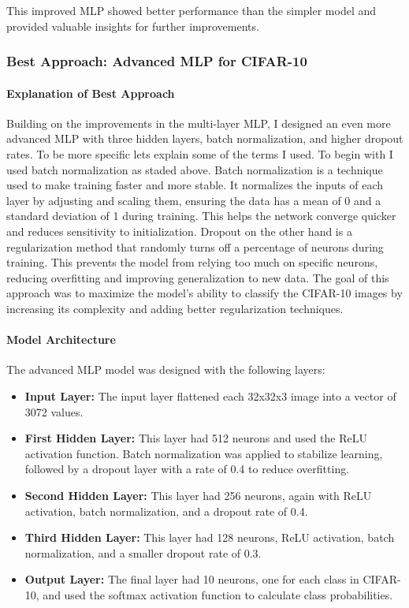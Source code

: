 \documentclass[lettersize,journal]{IEEEtran}
\begin{document}
This improved MLP showed better performance than the simpler model and provided valuable insights for further improvements.

\subsubsection{\textbf{Best Approach: Advanced MLP for CIFAR-10}}
\paragraph{\textbf{Explanation of Best Approach}}

Building on the improvements in the multi-layer MLP, I designed an even more advanced MLP with three hidden layers, batch normalization, and higher dropout rates. To be more specific lets explain some of the terms I used. To begin with I used batch normalization as staded above. Batch normalization is a technique used to make training faster and more stable. It normalizes the inputs of each layer by adjusting and scaling them, ensuring the data has a mean of 0 and a standard deviation of 1 during training. This helps the network converge quicker and reduces sensitivity to initialization. Dropout on the other hand is a regularization method that randomly turns off a percentage of neurons during training. This prevents the model from relying too much on specific neurons, reducing overfitting and improving generalization to new data. The goal of this approach was to maximize the model's ability to classify the CIFAR-10 images by increasing its complexity and adding better regularization techniques.

\paragraph{\textbf{Model Architecture}}

The advanced MLP model was designed with the following layers:
\begin{itemize}
    \item \textbf{Input Layer:} The input layer flattened each 32x32x3 image into a vector of 3072 values.
    \item \textbf{First Hidden Layer:} This layer had 512 neurons and used the ReLU activation function. Batch normalization was applied to stabilize learning, followed by a dropout layer with a rate of 0.4 to reduce overfitting.
    \item \textbf{Second Hidden Layer:} This layer had 256 neurons, again with ReLU activation, batch normalization, and a dropout rate of 0.4.
    \item \textbf{Third Hidden Layer:} This layer had 128 neurons, ReLU activation, batch normalization, and a smaller dropout rate of 0.3.
    \item \textbf{Output Layer:} The final layer had 10 neurons, one for each class in CIFAR-10, and used the softmax activation function to calculate class probabilities.
\end{itemize}
\end{document}
